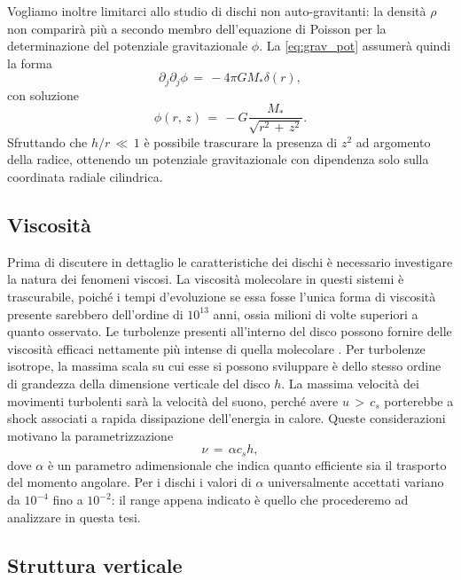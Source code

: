 Vogliamo inoltre limitarci allo studio di dischi non auto-gravitanti: la densità $\rho$ non comparirà più a secondo membro dell'equazione di Poisson per la determinazione del potenziale gravitazionale $\phi$. La \eqref{eq:grav_pot} assumerà quindi la forma
\begin{equation}
\partial_j\partial_j\phi\,=\,-4\pi GM_\ast\delta\left(r\right),
\label{eq:grav_pot1}
\end{equation}
con soluzione
\begin{equation}
\phi(r,\,z)\,=\,-G\frac{M_\ast}{\sqrt{r^2\,+\,z^2}}.
\label{eq:pot_form1}
\end{equation}
Sfruttando che $h/r\,\ll\,1$ è possibile trascurare la presenza di $z^2$ ad argomento della radice, ottenendo un potenziale gravitazionale con dipendenza solo sulla coordinata radiale cilindrica.

\subsection{Viscosità} \label{subsec: viscosity}

Prima di discutere in dettaglio le caratteristiche dei dischi è necessario investigare la natura dei fenomeni viscosi.
La viscosità molecolare in questi sistemi è trascurabile, poiché i tempi d'evoluzione se essa fosse l'unica forma di viscosità presente sarebbero dell'ordine di $10^{13}$ anni, ossia milioni di volte superiori a quanto osservato.
Le turbolenze presenti all'interno del disco possono fornire delle viscosità efficaci nettamente più intense di quella molecolare \parencite{ShakuraAlfaPer}.
Per turbolenze isotrope, la massima scala su cui esse si possono sviluppare è dello stesso ordine di grandezza della dimensione verticale del disco $h$. 
La massima velocità dei movimenti turbolenti sarà la velocità del suono, perché avere $u\,>\,c_s$ porterebbe a shock associati a rapida dissipazione dell'energia in calore. 
Queste considerazioni motivano la parametrizzazione
\begin{equation}
\nu\,=\,\alpha c_s h,
\label{eq:alfa_par}
\end{equation}
dove $\alpha$ è un parametro adimensionale che indica quanto efficiente sia il trasporto del momento angolare.
Per i dischi i valori di $\alpha$ universalmente accettati variano da $10^{-4}$ fino a $10^{-2}$: il range appena indicato è quello che procederemo ad analizzare in questa tesi.

\subsection{Struttura verticale} \label{subsec:str_vert_disc}

